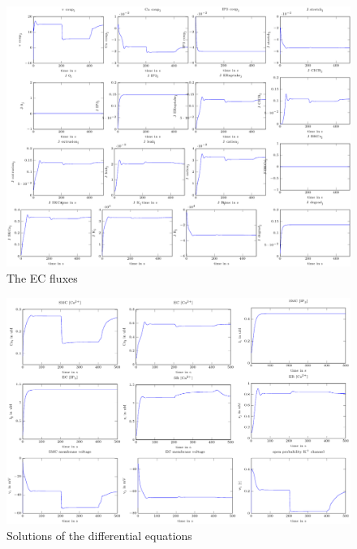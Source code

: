 \begin{landscape}
		\begin{figure}[h!]
			\centering
			\tiny 
			\setlength\figureheight{3 cm} 
			\setlength\figurewidth{4.5 cm}
			\includegraphics{figures/3_EC_fluxes.pdf}
			\caption{The EC fluxes}
			\label{fig:3ECF}
		\end{figure}
		\begin{figure}[h!]
			\centering
			\tiny  
			\setlength\figureheight{3.5 cm} 
			\setlength\figurewidth{6 cm}
			\includegraphics{figures/4_DFDT_new.pdf}
			\caption{Solutions of the differential equations}
			\label{fig:4DFDT}
		\end{figure}
		

\end{landscape}
